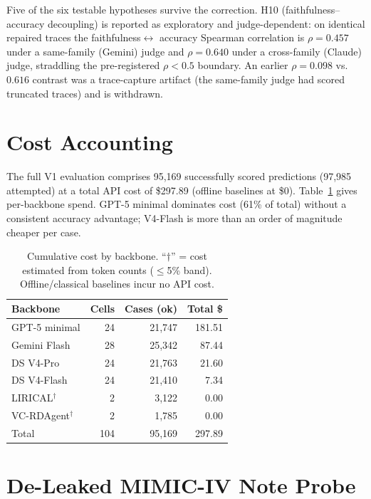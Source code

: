 \documentclass[letterpaper]{article} %
\begin{document}
Five of the six testable hypotheses survive the correction. H10
(faithfulness--accuracy decoupling) is reported as exploratory and
judge-dependent: on identical repaired traces the faithfulness$\leftrightarrow$
accuracy Spearman correlation is $\rho=0.457$ under a same-family (Gemini) judge
and $\rho=0.640$ under a cross-family (Claude) judge, straddling the
pre-registered $\rho<0.5$ boundary. An earlier $\rho=0.098$ vs.\ $0.616$ contrast
was a trace-capture artifact (the same-family judge had scored truncated traces)
and is withdrawn.

\section{Cost Accounting}
\label{app:cost}

The full V1 evaluation comprises 95,169 successfully scored predictions
(97,985 attempted) at a total API cost of \$297.89 (offline baselines at \$0).
Table~\ref{tab:cost} gives per-backbone spend. GPT-5 minimal dominates cost
(61\% of total) without a consistent accuracy advantage; V4-Flash is more than
an order of magnitude cheaper per case.

\begin{table}[h]
\centering
\scriptsize
\setlength{\tabcolsep}{4pt}
\caption{Cumulative cost by backbone. ``$\dagger$'' = cost estimated from token
counts ($\leq$5\% band). Offline/classical baselines incur no API cost.}
\label{tab:cost}
\begin{tabular}{@{}lrrr@{}}
\toprule
Backbone & Cells & Cases (ok) & Total \$ \\
\midrule
GPT-5 minimal & 24 & 21,747 & 181.51 \\
Gemini Flash & 28 & 25,342 & 87.44 \\
DS V4-Pro & 24 & 21,763 & 21.60 \\
DS V4-Flash & 24 & 21,410 & 7.34 \\
LIRICAL$^\dagger$ & 2 & 3,122 & 0.00 \\
VC-RDAgent$^\dagger$ & 2 & 1,785 & 0.00 \\
\midrule
Total & 104 & 95,169 & 297.89 \\
\bottomrule
\end{tabular}
\end{table}

\section{De-Leaked MIMIC-IV Note Probe}
\label{app:mimicnote}
\end{document}

